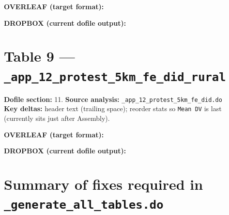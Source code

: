 \documentclass[10pt,landscape]{article}
\newcommand{\OV}[1]{%
  \begin{center}
    \colorbox{green!10}{\parbox{0.97\linewidth}{%
      \textbf{\textcolor{green!50!black}{OVERLEAF (target format):}}\par\vspace{0.3em}
      \centering #1
    }}
  \end{center}
}
\newcommand{\DB}[1]{%
  \begin{center}
    \colorbox{red!10}{\parbox{0.97\linewidth}{%
      \textbf{\textcolor{red!60!black}{DROPBOX (current dofile output):}}\par\vspace{0.3em}
      \centering #1
    }}
  \end{center}
}
\newcommand{\OVPATH}{/Users/anzony.quisperojas/Library/CloudStorage/Dropbox/Aplicaciones/Overleaf/sa_fires_politicians/tables}
\newcommand{\DBPATH}{/Users/anzony.quisperojas/Library/CloudStorage/Dropbox/sa_fires/proj_bureaucrats_farms/tex/paper/tables}
\begin{document}
\OV{}
\DB{}

\newpage

\section{Table 9 --- \texttt{\_app\_12\_protest\_5km\_fe\_did\_rural}}
\noindent\textbf{Dofile section:} 11.\quad
\textbf{Source analysis:} \texttt{\_app\_12\_protest\_5km\_fe\_did.do}\\
\textbf{Key deltas:} header text (trailing space); reorder stats so \texttt{Mean DV} is last
(currently sits just after Assembly).

\OV{}
\DB{}

\newpage

\section*{Summary of fixes required in \texttt{\_generate\_all\_tables.do}}
\end{document}
